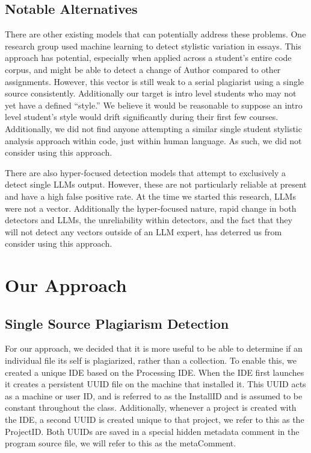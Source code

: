 \documentclass[10pt]{article}
\newcommand{\installID}{InstallID\xspace}
\newcommand{\projectID}{ProjectID\xspace}
\newcommand{\metaComment}{metaComment\xspace}
\begin{document}
\subsection{Notable Alternatives}
There are other existing models that can potentially address these problems.  One research group used machine learning to detect stylistic variation in essays\cite{english}.   This approach has potential, especially when applied across a student's entire code corpus, and might be able to detect a change of Author compared to other assignments.  However, this vector is still weak to a serial plagiarist using a single source consistently.  Additionally our target is intro level students who may not yet have a defined ``style.''  We believe it would be reasonable to suppose an intro level student's style would drift significantly during their first few courses.  Additionally, we did not find anyone attempting a similar single student stylistic analysis approach within code, just within human language.  As such, we did not consider using this approach.

There are also hyper-focused detection models that attempt to exclusively a detect single LLMs output.\cite{llm_detect}  However, these are not particularly reliable at present\cite{23_percent} and have a high false positive rate\cite{and_you_fail}.  At the time we started this research, LLMs were not a vector.  Additionally the hyper-focused nature, rapid change in both detectors and LLMs, the unreliability within detectors, and the fact that they will not detect any vectors outside of an LLM expert, has deterred us from consider using this approach.


\section{Our Approach} 
\subsection{Single Source Plagiarism Detection}
For our approach, we decided that it is more useful to be able to determine if an individual file its self is plagiarized, rather than a collection.  To enable this, we created a unique IDE based on the Processing IDE.  When the IDE first launches it creates a persistent UUID file on the machine that installed it.  This UUID acts as a machine or user ID, and is referred to as the \installID and is assumed to be constant throughout the class.  Additionally, whenever a project is created with the IDE, a second UUID is created unique to that project, we refer to this as the \projectID.  Both UUIDs are saved in a special hidden metadata comment in the program source file, we will refer to this as the \metaComment.
\end{document}
